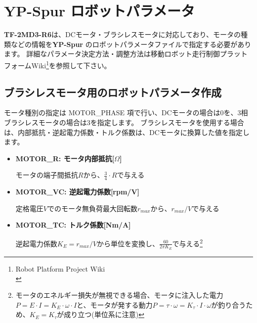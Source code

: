 \documentclass[11pt,a4j,openany,fleqn]{jbook}
\begin{document}
\newpage
\section{{\bf YP-Spur} ロボットパラメータ}
\label{sec:ロボットパラメータ}

{\bf TF-2MD3-R6}は、DCモータ・ブラシレスモータに対応しており、モータの種類などの情報を{\bf YP-Spur} のロボットパラメータファイルで指定する必要があります。
詳細なパラメータ決定方法・調整方法は移動ロボット走行制御プラットフォームWiki\footnote{Robot Platform Project Wiki \\ }を参照して下さい。\par

\subsection{ブラシレスモータ用のロボットパラメータ作成}
\label{sec:パラメータ作成}

モータ種別の指定は MOTOR\_PHASE 項で行い、DCモータの場合は0を、3相ブラシレスモータの場合は3を指定します。
ブラシレスモータを使用する場合は、内部抵抗・逆起電力係数・トルク係数は、DCモータに換算した値を指定します。
\begin{itemize}
\item {\bf MOTOR\_R: モータ内部抵抗[$\Omega$]} \par モータの端子間抵抗$R$から、$\frac{3}{4} \cdot R$で与える
\item {\bf MOTOR\_VC: 逆起電力係数[rpm/V]} \par 定格電圧$V$でのモータ無負荷最大回転数$r_{max}$から、$r_{max}/V$で与える
\item {\bf MOTOR\_TC: トルク係数[Nm/A]} \par 逆起電力係数$K_{E}=r_{max}/V$から単位を変換し、$\frac{60}{2\pi K_{E}}$で与える\footnote{モータのエネルギー損失が無視できる場合、モータに注入した電力$P = E \cdot I = K_{E} \cdot \omega \cdot I$と、モータが発する動力$P = \tau \cdot \omega = K_{\tau} \cdot I \cdot \omega$が釣り合うため、$K_{E} = K_{\tau}$が成り立つ(単位系に注意)}
\end{itemize}\par
\end{document}
